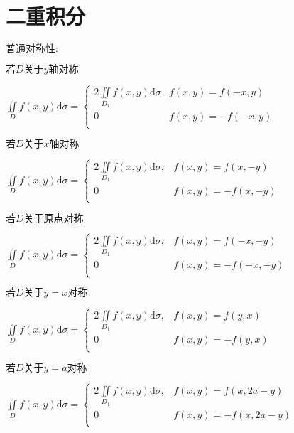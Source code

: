 \section{二重积分}

\begin{spacing}{\hangju}
\noindent $\mbox{普通对称性}\colon$

\noindent $\mbox{若}D\mbox{关于}y\mbox{轴对称}$

$\iint\limits_{D}{f(x, y)\mathrm{d}\sigma} = \left\{ \begin{array}{ll}
    2\iint\limits_{D_{1}}{f(x, y)\mathrm{d}\sigma} & f(x, y) = f(-x,y)\\
    0 & f(x, y) = -f(-x,y)\\
\end{array} \right.$

\noindent $\mbox{若}D\mbox{关于}x\mbox{轴对称}$

$\iint\limits_{D}{f(x, y)\mathrm{d}\sigma} = \left\{ \begin{array}{ll}
    2\iint\limits_{D_{1}}{f(x, y)\mathrm{d}\sigma}, & f(x, y) = f(x,-y)\\
    0 & f(x, y) = -f(x,-y)\\
\end{array} \right.$

\noindent $\mbox{若}D\mbox{关于原点对称}$

$\iint\limits_{D}{f(x, y)\mathrm{d}\sigma} = \left\{ \begin{array}{ll}
    2\iint\limits_{D_{1}}{f(x, y)\mathrm{d}\sigma}, & f(x, y) = f(-x,-y)\\
    0 & f(x, y) = -f(-x,-y)\\
\end{array} \right.$

\noindent $\mbox{若}D\mbox{关于}y=x\mbox{对称}$

$\iint\limits_{D}{f(x, y)\mathrm{d}\sigma} = \left\{ \begin{array}{ll}
    2\iint\limits_{D_{1}}{f(x, y)\mathrm{d}\sigma}, & f(x, y) = f(y,x)\\
    0 & f(x, y) = -f(y,x)\\
\end{array} \right.$

\noindent $\mbox{若}D\mbox{关于}y=a\mbox{对称}$

$\iint\limits_{D}{f(x, y)\mathrm{d}\sigma} = \left\{ \begin{array}{ll}
    2\iint\limits_{D_{1}}{f(x, y)\mathrm{d}\sigma}, & f(x, y) = f(x,2a-y)\\
    0 & f(x, y) = -f(x,2a-y)\\
\end{array} \right.$


\end{spacing}
